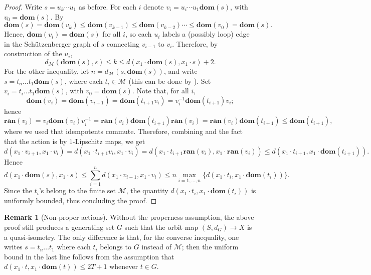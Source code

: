 \documentclass[svgnames]{amsart}
\theoremstyle{plain}
\theoremstyle{definition}
\newtheorem{rem}[thm]{Remark}
\newcommand{\dom}[1]{\mathbf{dom}\left(#1\right)}
\newcommand{\ran}[1]{\mathbf{ran}\left(#1\right)}
\begin{document}
\begin{proof}
   Write
    $s = u_{k} \cdots u_1$ as before. For each $i$ denote $v_{i} = u_{i} \cdots u_1 \dom{s}$, with $v_0 = \dom{s}$. By 
\[
	\dom{s} = \dom{v_{k}} 
	\leq \dom{v_{k-1}} \leq \dom{v_{k-2}} \cdots\leq \dom{v_0} = \dom{s}
.\]
Hence, $\dom{v_i} = \dom{s}$ for all $i$, so each $u_i$ labels a (possibly loop) edge in the Schützenberger graph of $s$ connecting $v_{i-1}$ to $v_i$. Therefore, by construction of the $u_i$,
$$d_{\mathcal{M}}( \dom{s}, s) \leq k \leq d(x_1 \cdot \dom{s}, x_1 \cdot s) + 2.$$
For the other inequality, let $n=d_{\mathcal M}(s,\dom{s})$, and write $s=t_n\ldots t_1\dom{s}$, where each $t_i\in \mathcal M$ (this can be done by ). Set $v_i=t_i\ldots t_1 \dom{s}$, with $v_0=\dom{s}$. Note that, for all $i$,
\[\dom{v_{i}} = \dom{v_{i+1}} = \dom{t_{i+1}v_{i}} = v_{i}^{-1}\dom{t_{i+1}}v_{i};\] hence
\[\ran{v_{i}}=v_i \dom{v_i}v_i^{-1}=\ran{v_i}\dom{t_{i+1}}\ran{v_i}= \ran{v_i}\dom{t_{i+1}}\leq \dom{t_{i+1}},\]
where we used that idempotents commute. Therefore, combining  and the fact that the action is by $1$-Lipschitz maps, we get
 \[
	 d(x_1 \cdot v_{i+1}, x_1 \cdot v_{i}) =d(x_1 \cdot t_{i+1}v_i, x_1 \cdot v_{i}) = d(x_1 \cdot t_{i+1} \ran{v_{i}}
	 , x_1 \cdot \ran{v_{i}})
	 \leq d(x_1 \cdot t_{i+1}, x_1 \cdot \dom{t_{i+1}})
.\]
Hence
\[
	d(x_1 \cdot \dom{s}, x_1 \cdot s)
	\leq \sum_{i=1}^{n} d(x_1 \cdot v_{i-1}, x_1 \cdot v_{i})\leq n \max_{i=1,\ldots, n} \{d(x_1 \cdot t_{i}, x_1 \cdot \dom{t_{i}}) \}.\]
Since the $t_i$'s belong to the finite set $\mathcal M$, the quantity $d(x_1 \cdot t_{i}, x_1 \cdot \dom{t_{i}})$ is uniformly bounded, thus concluding the proof.
\end{proof}

\begin{rem}[Non-proper actions]\label{rem:no_properness_is_fine}
	Without the properness assumption, the above proof still produces a generating set $G$ such that the orbit map $(S,d_{G})\to X$ is a quasi-isometry. The only difference is that, for the converse inequality, one writes $s=t_n\ldots t_1$ where each $t_i$ belongs to $G$ instead of $\mathcal M$; then the uniform bound in the last line follows from the assumption that $d(x_1 \cdot t, x_1 \cdot \dom{t})\le 2T+1$ whenever $t\in G$.
\end{rem}
\end{document}
